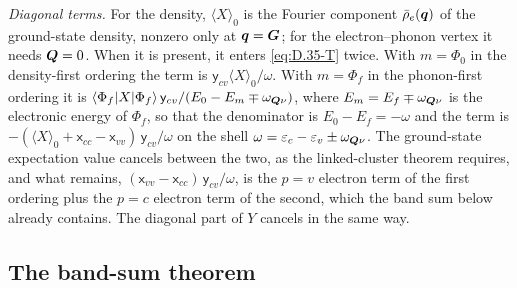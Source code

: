 \emph{Diagonal terms.} For the density, $\langle X\rangle_0$ is the Fourier component $\bar\rho_e(\bm{q})$ of the ground-state density, nonzero only at $\bm{q} = \bm{G}$; for the electron--phonon vertex it needs $\bm{Q} = 0$. When it is present, it enters \cref{eq:D.35-T} twice. With $m = \Phi_0$ in the density-first ordering the term is $\mathsf{y}_{cv}\langle X\rangle_0/\omega$. With $m = \Phi_f$ in the phonon-first ordering it is $\langle\Phi_f|X|\Phi_f\rangle\,\mathsf{y}_{cv}/(E_0 - E_m \mp \omega_{\bm{Q}\nu})$, where $E_m = E_f \mp \omega_{\bm{Q}\nu}$ is the electronic energy of $\Phi_f$, so that the denominator is $E_0 - E_f = -\omega$ and the term is $-(\langle X\rangle_0 + \mathsf{x}_{cc} - \mathsf{x}_{vv})\,\mathsf{y}_{cv}/\omega$ on the shell $\omega = \varepsilon_c - \varepsilon_v \pm \omega_{\bm{Q}\nu}$. The ground-state expectation value cancels between the two, as the linked-cluster theorem requires, and what remains, $(\mathsf{x}_{vv} - \mathsf{x}_{cc})\,\mathsf{y}_{cv}/\omega$, is the $p = v$ electron term of the first ordering plus the $p = c$ electron term of the second, which the band sum below already contains. The diagonal part of $Y$ cancels in the same way.

\subsection*{The band-sum theorem}


